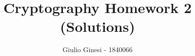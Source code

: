 \title{\textbf{Cryptography Homework 2}\\ {\normalsize (Solutions)}}
\author{Giulio Ginesi - 1840066}
\date{}